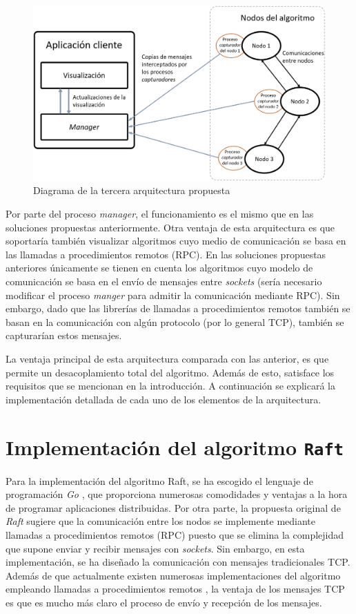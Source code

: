 \begin{figure}[h]
  \centering
  \includegraphics[width=0.7\linewidth]{imagenes/arquitectura3}
  \caption{Diagrama de la tercera arquitectura propuesta}
  \label{fig:arquitectura3}
\end{figure}

Por parte del proceso \textit{manager}, el funcionamiento es el mismo que en las soluciones propuestas anteriormente. Otra ventaja de esta arquitectura es que soportaría también visualizar algoritmos cuyo medio de comunicación se basa en las llamadas a procedimientos remotos (RPC). En las soluciones propuestas anteriores únicamente se tienen en cuenta los algoritmos cuyo modelo de comunicación se basa en el envío de mensajes entre \textit{sockets} (sería necesario modificar el proceso \textit{manger} para admitir la comunicación mediante RPC). Sin embargo, dado que las librerías de llamadas a procedimientos remotos también se basan en la comunicación con algún protocolo (por lo general TCP), también se capturarían estos mensajes.

La ventaja principal de esta arquitectura comparada con las anterior, es que permite un desacoplamiento total del algoritmo. Además de esto, satisface los requisitos que se mencionan en la introducción. A continuación se explicará la implementación detallada de cada uno de los elementos de la arquitectura.

\section{Implementación del algoritmo \texttt{Raft}}

Para la implementación del algoritmo Raft, se ha escogido el lenguaje de programación \textit{Go} \cite{go}, que proporciona numerosas comodidades y ventajas a la hora de programar aplicaciones distribuidas. Por otra parte, la propuesta original de \textit{Raft} \cite{raft1} sugiere que la comunicación entre los nodos se implemente mediante llamadas a procedimientos remotos (RPC) puesto que se elimina la complejidad que supone enviar y recibir mensajes con \textit{sockets}. Sin embargo, en esta implementación, se ha diseñado la comunicación con mensajes tradicionales TCP. Además de que actualmente existen numerosas implementaciones del algoritmo empleando llamadas a procedimientos remotos \cite{raftetcd}\cite{rafteliben}, la ventaja de los mensajes TCP es que es mucho más claro el proceso de envío y recepción de los mensajes.

